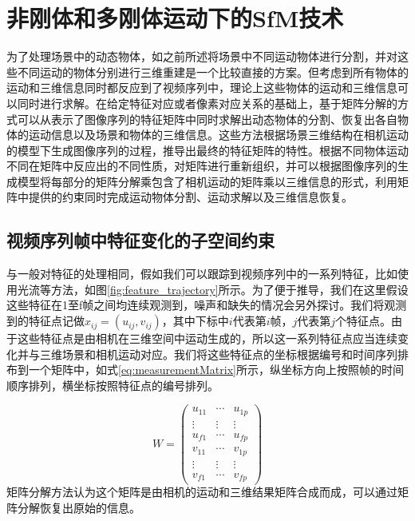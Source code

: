 \section{非刚体和多刚体运动下的SfM技术}
\label{subsec:non-rigid_SfM}
为了处理场景中的动态物体，如之前所述将场景中不同运动物体进行分割，并对这些不同运动的物体分别进行三维重建是一个比较直接的方案。但考虑到所有物体的运动和三维信息同时都反应到了视频序列中，理论上这些物体的运动和三维信息可以同时进行求解\cite{Tomasi1992Shape}。在给定特征对应或者像素对应关系的基础上，基于矩阵分解的方式可以从表示了图像序列的特征矩阵中同时求解出动态物体的分割、恢复出各自物体的运动信息以及场景和物体的三维信息。这些方法根据场景三维结构在相机运动的模型下生成图像序列的过程，推导出最终的特征矩阵的特性。根据不同物体运动不同在矩阵中反应出的不同性质，对矩阵进行重新组织，并可以根据图像序列的生成模型将每部分的矩阵分解乘包含了相机运动的矩阵乘以三维信息的形式，利用矩阵中提供的约束同时完成运动物体分割、运动求解以及三维信息恢复。

\subsection{视频序列帧中特征变化的子空间约束}\label{subsec:subspace}
与一般对特征的处理相同，假如我们可以跟踪到视频序列中的一系列特征，比如使用光流等方法\cite{Fanani2016Keypoint}，如图\ref{fig:feature_trajectory}所示。为了便于推导，我们在这里假设这些特征在1至f帧之间均连续观测到，噪声和缺失的情况会另外探讨。我们将观测到的特征点记做$x_{ij}=(u_{ij},v_{ij})$，其中下标中$i$代表第$i$帧，$j$代表第$j$个特征点。由于这些特征点是由相机在三维空间中运动生成的，所以这一系列特征点应当连续变化并与三维场景和相机运动对应。我们将这些特征点的坐标根据编号和时间序列排布到一个矩阵中，如式\eqref{eq:measurementMatrix}所示，纵坐标方向上按照帧的时间顺序排列，横坐标按照特征点的编号排列。

\begin{equation}\label{eq:measurementMatrix}
W=
\begin{pmatrix}
u_{11}& \cdots & u_{1p}\\
\vdots& \vdots &\vdots\\
u_{f1}& \cdots & u_{fp}\\
v_{11}& \cdots & v_{1p}\\
\vdots& \vdots &\vdots\\
v_{f1}& \cdots & v_{fp}
\end{pmatrix}
\end{equation}
矩阵分解方法认为这个矩阵是由相机的运动和三维结果矩阵合成而成，可以通过矩阵分解恢复出原始的信息。

